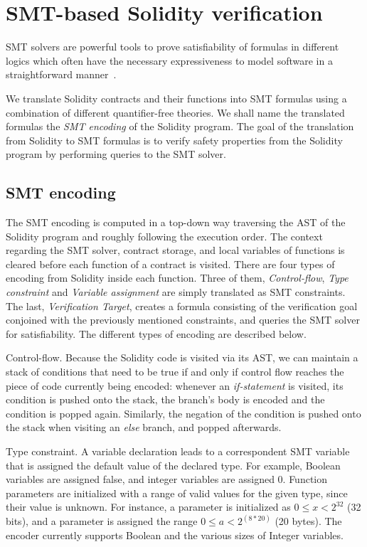 \section{SMT-based Solidity verification}
\label{section:smt}

SMT solvers are powerful tools to prove satisfiability of formulas in different
logics which often have the necessary expressiveness to model software in a
straightforward manner~\cite{Komuravelli13,Alt17,Donaldson11,Beyer11}.

We translate Solidity contracts and their functions into SMT formulas using a
combination of different quantifier-free theories.
%
We shall name the translated formulas the \emph{SMT encoding} of the Solidity
program.
%
The goal of the translation from Solidity to SMT formulas is to verify safety
properties from the Solidity program by performing queries to the SMT solver.

\subsection{SMT encoding}

The SMT encoding is computed in a top-down way traversing the AST of the
Solidity program and roughly following the execution order.
%
The context regarding the SMT solver, contract storage, and local variables of
functions is cleared before each function of a contract is visited.
%
There are four types of encoding from Solidity inside each function.
%
Three of them, \emph{Control-flow}, \emph{Type constraint} and \emph{Variable assignment}
are simply translated as SMT constraints.
%
The last, \emph{Verification Target}, creates a formula consisting of the
verification goal conjoined with the previously mentioned constraints, and
queries the SMT solver for satisfiability.
%
The different types of encoding are described below.

\begin{paragraph}{Control-flow.}
Because the Solidity code is visited via its AST, we can maintain a stack of
conditions that need to be true if and only if control flow reaches the piece
of code currently being encoded: whenever an \emph{if-statement} is visited,
its condition is pushed onto the stack, the branch's body is encoded and the
condition is popped again.
%
Similarly, the negation of the condition is pushed onto the stack when visiting
an \emph{else} branch, and popped afterwards.
\end{paragraph}

\begin{paragraph}{Type constraint.}
A variable declaration leads to a correspondent SMT variable that is assigned
the default value of the declared type.
%
For example, Boolean variables are assigned false, and integer variables are
assigned 0.
%
Function parameters are initialized with a range of valid values for the given
type, since their value is unknown.  For instance, a parameter 
is initialized as $0 \le x < 2^{32}$ (32 bits), and a parameter  is assigned the range $0 \le a < 2^{(8*20)}$ (20 bytes).
%
The encoder currently supports Boolean and the various sizes of Integer
variables.

\end{paragraph}

